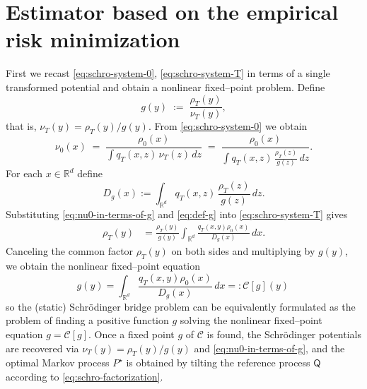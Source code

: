 \documentclass[11pt]{article}
\theoremstyle{remark}
\numberwithin{equation}{section}
\def\RefLaw{\mathsf{Q}}
\begin{document}
\section{Estimator based on the empirical risk minimization}


First we  recast \eqref{eq:schro-system-0}, \eqref{eq:schro-system-T} in terms of a single transformed potential and obtain a nonlinear
fixed--point problem. Define
\begin{equation}\label{eq:def-g}
  g(y) \;:=\; \frac{\rho_T(y)}{\nu_T(y)},
\end{equation}
that is, $\nu_T(y) = \rho_T(y)/g(y)$. From \eqref{eq:schro-system-0} we obtain
\begin{equation}\label{eq:nu0-in-terms-of-g}
  \nu_0(x)
  \;=\;
  \frac{\rho_0(x)}{\displaystyle \int q_T(x,z)\,\nu_T(z)\,dz}
  \;=\;
  \frac{\rho_0(x)}{\displaystyle \int q_T(x,z)\,\frac{\rho_T(z)}{g(z)}\,dz}.
\end{equation}
For each $x\in\mathbb{R}^d$ define
\begin{equation}
\label{D definition intro}
  D_{g}(x)
  :=
  \int_{\mathbb{R}^d} q_T(x,z)\,\frac{\rho_T(z)}{g(z)}\,dz.
\end{equation}
Substituting \eqref{eq:nu0-in-terms-of-g} and \eqref{eq:def-g} into
\eqref{eq:schro-system-T} gives
\[
\begin{aligned}
  \rho_T(y)
  &= \frac{\rho_T(y)}{g(y)}\int_{\mathbb{R}^d}
     \frac{q_T(x, y) \rho_0(x)}{D_g(x)}\,dx.
\end{aligned}
\]
Canceling the common factor $\rho_T(y)$ on both sides and multiplying by $g(y)$,
we obtain the nonlinear fixed--point equation
\begin{equation}\label{eq:def-C-operator}
  g(y) =
  \int_{\mathbb{R}^d}
    \frac{q_T(x, y) \rho_0(x)}{D_g(x)}
    \,dx =:\mathcal{C}[g](y) \, 
\end{equation}
so the (static) Schr\"odinger bridge problem can be equivalently formulated
as the problem of finding a positive function $g$ solving the nonlinear
fixed--point equation
\(g = \mathcal{C}[g]\). 
Once a fixed point $g$ of $\mathcal{C}$ is found, the Schr\"odinger potentials
are recovered via $\nu_T(y) = \rho_T(y)/g(y)$ and \eqref{eq:nu0-in-terms-of-g},
and the optimal Markov process $P^\star$ is obtained by tilting the reference
process $\RefLaw$ according to \eqref{eq:schro-factorization}.
\end{document}
